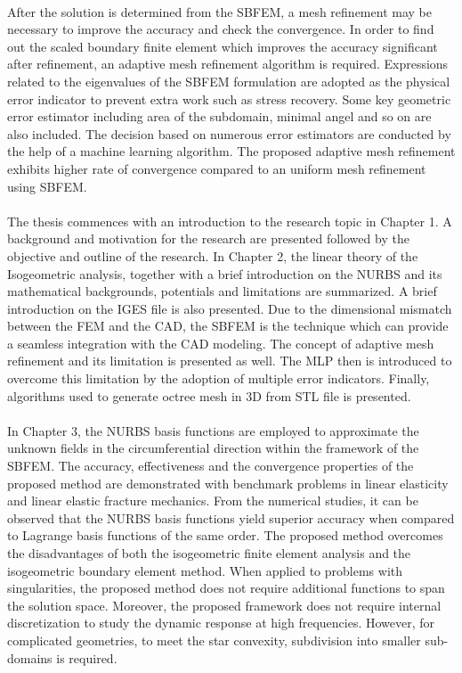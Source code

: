 \paragraph{}
After the solution is determined from the SBFEM, a mesh refinement may be necessary to improve the accuracy and check the convergence.
In order to find out the scaled boundary finite element which improves the accuracy significant after refinement, an adaptive mesh refinement algorithm is required.
Expressions related to the eigenvalues of the SBFEM formulation are adopted as the physical error indicator to prevent extra work such as stress recovery.
Some key geometric error estimator including area of the subdomain, minimal angel and so on are also included.
The decision based on numerous error estimators are conducted by the help of a machine learning algorithm.
The proposed adaptive mesh refinement exhibits higher rate of convergence compared to an uniform mesh refinement using SBFEM.

\paragraph{}
The thesis commences with an introduction to the research topic in Chapter 1.
A background and motivation for the research are presented followed by the objective and outline of the research.
In Chapter 2, the linear theory of the Isogeometric analysis, together with a brief introduction on the NURBS and its mathematical backgrounds, potentials and limitations are summarized.
A brief introduction on the IGES file is also presented.
Due to the dimensional mismatch between the FEM and the CAD, the SBFEM is the technique which can provide a seamless integration with the CAD modeling.
The concept of adaptive mesh refinement and its limitation is presented as well.
The MLP then is introduced to overcome this limitation by the adoption of multiple error indicators.
Finally, algorithms used to generate octree mesh in 3D from STL file is presented.

\paragraph{}
In Chapter 3, the NURBS basis functions are employed to approximate the unknown fields in the circumferential direction within the framework of the SBFEM.
The accuracy, effectiveness and the convergence properties of the proposed method are demonstrated with benchmark problems in linear elasticity and linear elastic fracture mechanics.
From the numerical studies, it can be observed that the NURBS basis functions yield superior accuracy when compared to Lagrange basis functions of the same order.
The proposed method overcomes the disadvantages of both the isogeometric finite element analysis and the isogeometric boundary element method. 
When applied to problems with singularities, the proposed method does not require additional functions to span the solution space.
Moreover, the proposed framework does not require internal discretization to study the dynamic response at high frequencies.
However, for complicated geometries, to meet the star convexity, subdivision into smaller sub-domains is required.

